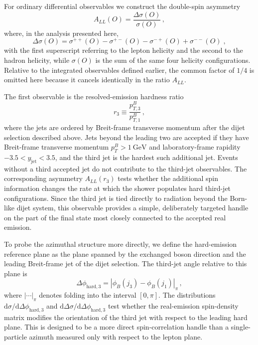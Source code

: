 \documentclass[a4paper,11pt]{article}
\begin{document}
For ordinary differential observables we construct the double-spin asymmetry
\begin{equation}
  A_{LL}(O)=\frac{\Delta\sigma(O)}{\sigma(O)}\,,
\end{equation}
where, in the analysis presented here,
\begin{equation}
  \Delta\sigma(O)=\sigma^{++}(O)-\sigma^{+-}(O)-\sigma^{-+}(O)+\sigma^{--}(O)\;,
\end{equation}
with the first superscript referring to the lepton helicity and the second to
the hadron helicity, while $\sigma(O)$ is the sum of the same four helicity
configurations. Relative to the integrated observables defined earlier, the
common factor of $1/4$ is omitted here because it cancels identically in the
ratio $A_{LL}$.

The first observable is the resolved-emission hardness ratio
\begin{equation}
  r_3 \equiv \frac{p_{T,3}^{B}}{p_{T,1}^{B}}\,,
\end{equation}
where the jets are ordered by Breit-frame transverse momentum after the dijet
selection described above. Jets beyond the leading two are accepted if they
have Breit-frame transverse momentum $p_T^{B}>1~\mathrm{GeV}$ and
laboratory-frame rapidity $-3.5<y_{\mathrm{jet}}<3.5$, and the third jet is
the hardest such additional jet. Events without a third accepted jet do not
contribute to the third-jet observables. The corresponding asymmetry $A_{LL}(r_3)$ tests
whether the additional spin information changes the rate at which the shower
populates hard third-jet configurations.  Since the third jet is tied directly
to radiation beyond the Born-like dijet system, this observable provides a
simple, deliberately targeted handle on the part of the final state most
closely connected to the accepted real emission.

To probe the azimuthal structure more directly, we define the hard-emission
reference plane as the plane spanned by the exchanged boson direction and the
leading Breit-frame jet of the dijet selection.  The third-jet angle relative to this plane is
\begin{equation}
  \Delta\phi_{\mathrm{hard},3}
  =\left|\phi_B(j_3)-\phi_B(j_1)\right|_{\pi}\,,
\end{equation}
where $|\cdots|_{\pi}$ denotes folding into the interval $[0,\pi]$.  The
distributions
$\mathrm{d}\sigma/\mathrm{d}\Delta\phi_{\mathrm{hard},3}$ and
$\mathrm{d}\Delta\sigma/\mathrm{d}\Delta\phi_{\mathrm{hard},3}$ test whether
the real-emission spin-density matrix modifies the orientation of the third jet
with respect to the leading hard plane.  This is designed to be a more direct
spin-correlation handle than a single-particle azimuth measured only with
respect to the lepton plane.
\end{document}
